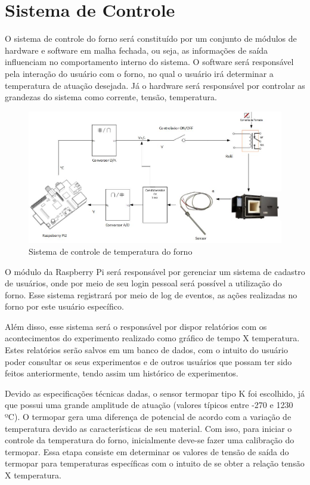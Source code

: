 \section{Sistema de Controle}

O sistema de controle do forno será constituído por um conjunto de módulos de hardware e software em malha fechada, ou seja, as informações de saída influenciam no comportamento interno do sistema. O software será responsável pela interação do usuário com o forno, no qual o usuário irá determinar a temperatura de atuação desejada. Já o hardware será responsável por controlar as grandezas do sistema como corrente, tensão, temperatura.

\begin{figure}[h]
	\centering
	\label{diagrama}
	\includegraphics[keepaspectratio=true,scale=0.5]{figuras/diagrama.jpg}
	\caption{Sistema de controle de temperatura do forno}
\end{figure}

O módulo da Raspberry Pi será responsável por gerenciar um sistema de cadastro de usuários, onde por meio de seu login pessoal será possível a utilização do forno. Esse sistema registrará por meio de log de eventos, as ações realizadas no forno por este usuário específico.

Além disso, esse sistema será o responsável por dispor relatórios com os acontecimentos do experimento realizado como gráfico de tempo X temperatura. Estes relatórios serão salvos em um banco de dados, com o intuito do usuário poder consultar os seus experimentos e de outros usuários que possam ter sido feitos anteriormente, tendo assim um histórico de experimentos.

Devido as especificações técnicas dadas, o sensor termopar tipo K foi escolhido, já que possui uma grande amplitude de atuação (valores típicos entre -270 e 1230 ºC). O termopar gera uma diferença de potencial de acordo com a variação de temperatura devido as características de seu material. Com isso, para iniciar o controle da temperatura do forno, inicialmente deve-se fazer uma calibração do termopar. Essa etapa consiste em determinar os valores de tensão de saída do termopar para temperaturas específicas com o intuito de se obter a relação tensão X temperatura.

